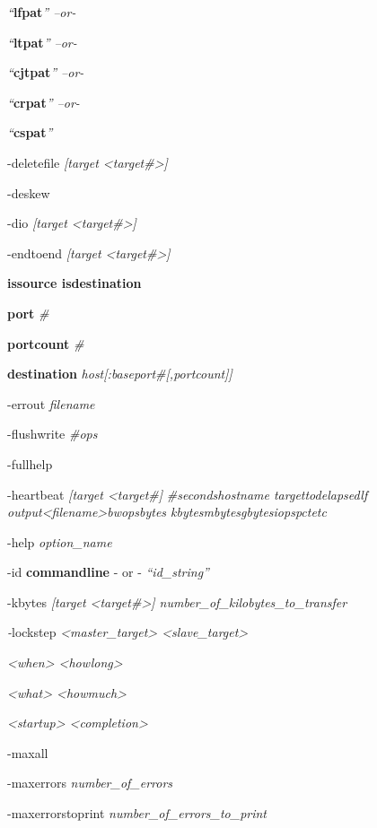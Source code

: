 \emph{``}\textbf{lfpat}\emph{'' --or-}

\emph{``}\textbf{ltpat}\emph{'' --or-}

\emph{``}\textbf{cjtpat}\emph{'' --or-}

\emph{``}\textbf{crpat}\emph{'' --or-}

\emph{``}\textbf{cspat}\emph{''}

-deletefile \emph{{[}target \textless target\#\textgreater{]}}

-deskew

-dio \emph{{[}target \textless target\#\textgreater{]}}

-endtoend \emph{{[}target \textless target\#\textgreater{]}}

\textbf{issource \textbar{} isdestination}

\textbf{port} \emph{\#}

\textbf{portcount} \emph{\#}

\textbf{destination} \emph{host{[}:baseport\#{[},portcount{]}{]}}

-errout \emph{filename}

-flushwrite \emph{\#ops}

-fullhelp

-heartbeat \emph{{[}target \textless target\#{]}} \emph{\#seconds\textbar hostname\textbar{} target\textbar tod\textbar elapsed\textbar lf\textbar{} output\textless filename\textgreater\textbar bw\textbar ops\textbar bytes\textbar{} kbytes\textbar mbytes\textbar gbytes\textbar iops\textbar pct\textbar etc}

-help \emph{option\_name}

-id \textbf{commandline} - or - \emph{``id\_string''}

-kbytes \emph{{[}target \textless target\#\textgreater{]} number\_of\_kilobytes\_to\_transfer}

\emph{-}lockstep \emph{\textless master\_target\textgreater{} \textless slave\_target\textgreater{}}

\emph{\textless when\textgreater{} \textless howlong\textgreater{}}

\emph{\textless what\textgreater{} \textless howmuch\textgreater{}}

\emph{\textless startup\textgreater{} \textless completion\textgreater{}}

-maxall

-maxerrors \emph{number\_of\_errors}

-maxerrorstoprint \emph{number\_of\_errors\_to\_print}

